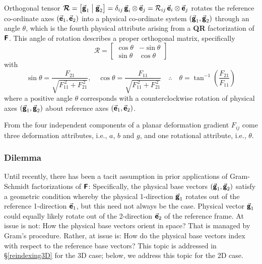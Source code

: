 Orthogonal tensor $\boldsymbol{\mathcal{R}} = \bigl[ \vec{\boldsymbol{\mathsf{g}}}_1 \bigm| \vec{\boldsymbol{\mathsf{g}}}_2 \bigr] = \delta_{ij} \, \vec{\boldsymbol{\mathsf{g}}}_i \otimes \vec{\boldsymbol{\mathsf{e}}}_j = \mathcal{R}_{ij} \, \vec{\boldsymbol{\mathsf{e}}}_i \otimes \vec{\boldsymbol{\mathsf{e}}}_j$ rotates the reference co-ordinate axes $( \vec{\boldsymbol{\mathsf{e}}}_1 , \vec{\boldsymbol{\mathsf{e}}}_2 )$ into a physical co-ordinate system $( \vec{\boldsymbol{\mathsf{g}}}_1 , \vec{\boldsymbol{\mathsf{g}}}_2 )$ through an angle $\theta$, which is the fourth physical attribute arising from a \textbf{QR} factorization of $\boldsymbol{\mathsf{F}}$.  This angle of rotation describes a proper orthogonal matrix, specifically
\begin{equation}
\boldsymbol{\mathcal{R}} = \begin{bmatrix}
\cos \theta & -\sin \theta \\
\sin \theta & \cos \theta
\end{bmatrix} 
\label{rotation}
\end{equation}  
with
\begin{equation}
\sin \theta = \frac{F_{21}}
{\sqrt{F_{11}^{\,2} + F_{21}^{\,2}}} , \quad
\cos \theta = \frac{F_{11}}
{\sqrt{F_{11}^{\,2} + F_{21}^{\,2}}} 
\quad \therefore \quad
\theta = \tan^{-1} \left( \frac{F_{21}}{F_{11}} \right)
\label{trigFns}
\end{equation}  
where a positive angle $\theta$ corresponds with a counter\-clockwise rotation of physical axes $( \vec{\boldsymbol{\mathsf{g}}}_1 , \vec{\boldsymbol{\mathsf{g}}}_2 )$ about reference axes $( \vec{\boldsymbol{\mathsf{e}}}_1 , \vec{\boldsymbol{\mathsf{e}}}_2 )$.  

From the four independent components of a planar deformation gradient $F_{ij}$ come three deformation attributes, i.e., $a$, $b$ and $g$, and one rotational attribute, i.e., $\theta$.


\subsubsection{Dilemma}
\label{secDilemma} 

Until recently, \cite{Pauletal20} there has been a tacit assumption in prior applications of Gram-Schmidt factorizations of $\boldsymbol{\mathsf{F}}$: Specifically, the physical base vectors $( \vec{\boldsymbol{\mathsf{g}}}_1 , \vec{\boldsymbol{\mathsf{g}}}_2 )$ satisfy a geometric condition whereby the physical 1-direction $\vec{\boldsymbol{\mathsf{g}}}_1$ rotates out of the reference 1-direction $\vec{\boldsymbol{\mathsf{e}}}_1$, but this need not always be the case.  Physical vector $\vec{\boldsymbol{\mathsf{g}}}_1$ could equally likely rotate out of the 2-direction $\vec{\boldsymbol{\mathsf{e}}}_2$ of the reference frame.  At issue is not: How the physical base vectors orient in space?  That is managed by Gram's procedure.  Rather, at issue is: How do the physical base vectors index with respect to the reference base vectors?  This topic is addressed in \S\ref{reindexing3D} for the 3D case; below, we address this topic for the 2D case.

